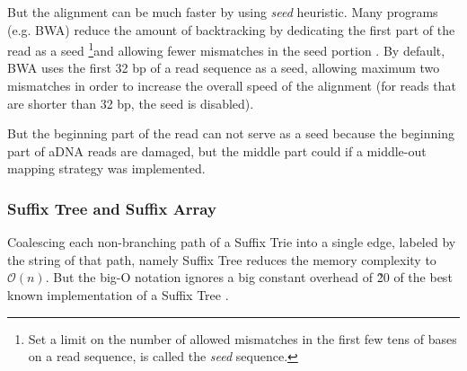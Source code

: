 \documentclass[11pt,a4paper]{report}
\begin{document}
But the alignment can be much faster by using \emph{seed} 
heuristic. 
Many programs (e.g. BWA) reduce the amount of backtracking  
by dedicating the first part of the read as a seed 
\footnote{ Set a limit on the number of allowed mismatches 
in the first few tens of bases on a read sequence, is called
the \emph{seed} sequence.}and allowing fewer mismatches in 
the seed portion \cite{bwa}. By default, BWA uses the first 
32 bp of a read sequence as a seed, allowing maximum two 
mismatches in order to increase the overall speed of the 
alignment (for reads that are shorter than 32 bp, the seed 
is disabled)\cite{bwa}. 

But the beginning part of the read can not serve as a seed
because the beginning part of aDNA reads are damaged,
but the middle part could if a middle-out mapping strategy
was implemented.




\subsubsection{Suffix Tree and Suffix Array}
\label{Suffix Tree and Suffix Array}

Coalescing each non-branching path of a Suffix Trie into 
a single edge, labeled by the string of that path, namely 
Suffix Tree reduces the memory complexity to $\mathcal{O}(n)$.
But the big-O notation ignores a big constant overhead 
of \~20 of the best known implementation of a Suffix Tree
\cite{gusfield1997algorithms}.\\ 
\end{document}

